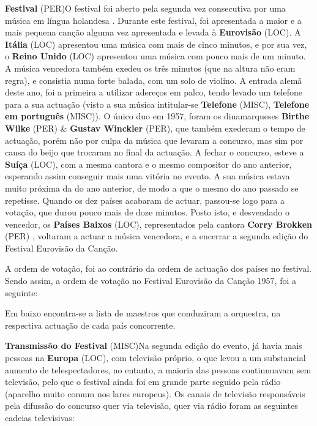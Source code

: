 \documentclass[12pt,a4paper]{article}
\begin{document}
\textbf{Festival} (PER)O festival foi aberto pela segunda vez consecutiva por uma música em língua holandesa . Durante este festival, foi apresentada a maior e a mais pequena canção alguma vez apresentada e levada à \textbf{Eurovisão} (LOC). A \textbf{Itália} (LOC) apresentou uma música com mais de cinco minutos, e por sua vez, o \textbf{Reino Unido} (LOC) apresentou uma música com pouco mais de um minuto. A música vencedora também exedeu os três minutos (que na altura não eram regra), e consistia numa forte balada, com um solo de violino. A entrada alemã deste ano, foi a primeira a utilizar adereços em palco, tendo levado um telefone para a sua actuação (visto a sua música intitular-se \textbf{Telefone} (MISC), \textbf{Telefone em português} (MISC)). O único duo em 1957, foram os dinamarqueses \textbf{Birthe Wilke} (PER) \& \textbf{Gustav Winckler} (PER), que também exederam o tempo de actuação, porém não por culpa da música que levaram a concurso, mas sim por causa do beijo que trocaram no final da actuação. A fechar o concurso, esteve a \textbf{Suíça} (LOC), com a mesma cantora e o mesmo compositor do ano anterior, esperando assim conseguir mais uma vitória no evento. A sua música estava muito próxima da do ano anterior, de modo a que o mesmo do ano passado se repetisse. Quando os dez países acabaram de actuar, passou-se logo para a votação, que durou pouco mais de doze minutos. Posto isto, e desvendado o vencedor, os \textbf{Países Baixos} (LOC), representados pela cantora \textbf{Corry Brokken} (PER) , voltaram a actuar a música vencedora, e a encerrar a segunda edição do Festival Eurovisão da Canção.

A ordem de votação, foi ao contrário da ordem de actuação dos países no festival. Sendo assim, a ordem de votação no Festival Eurovisão da Canção 1957, foi a seguinte:

Em baixo encontra-se a lista de maestros que conduziram a orquestra, na respectiva actuação de cada país concorrente.



\textbf{Transmissão do Festival} (MISC)Na segunda edição do evento, já havia mais pessoas na \textbf{Europa} (LOC), com televisão próprio, o que levou a um substancial aumento de telespectadores, no entanto, a maioria das pessoas continnuavam sem televisão, pelo que o festival ainda foi em grande parte seguido pela rádio (aparelho muito comum nos lares europeus). Os canais de televisão responsáveis pela difussão do concurso quer via televisão, quer via rádio foram as seguintes cadeias televisivas:
\end{document}
